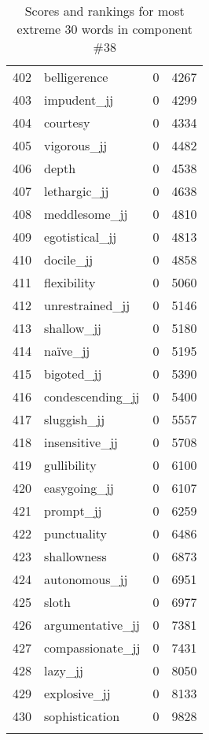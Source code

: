\begin{longtable}[!htbp]{| rlr@{.}l |}
    402 & belligerence & 0 & 4267 \\
    403 & impudent\_jj & 0 & 4299 \\
    404 & courtesy & 0 & 4334 \\
    405 & vigorous\_jj & 0 & 4482 \\
    406 & depth & 0 & 4538 \\
    407 & lethargic\_jj & 0 & 4638 \\
    408 & meddlesome\_jj & 0 & 4810 \\
    409 & egotistical\_jj & 0 & 4813 \\
    410 & docile\_jj & 0 & 4858 \\
    411 & flexibility & 0 & 5060 \\
    412 & unrestrained\_jj & 0 & 5146 \\
    413 & shallow\_jj & 0 & 5180 \\
    414 & naïve\_jj & 0 & 5195 \\
    415 & bigoted\_jj & 0 & 5390 \\
    416 & condescending\_jj & 0 & 5400 \\
    417 & sluggish\_jj & 0 & 5557 \\
    418 & insensitive\_jj & 0 & 5708 \\
    419 & gullibility & 0 & 6100 \\
    420 & easygoing\_jj & 0 & 6107 \\
    421 & prompt\_jj & 0 & 6259 \\
    422 & punctuality & 0 & 6486 \\
    423 & shallowness & 0 & 6873 \\
    424 & autonomous\_jj & 0 & 6951 \\
    425 & sloth & 0 & 6977 \\
    426 & argumentative\_jj & 0 & 7381 \\
    427 & compassionate\_jj & 0 & 7431 \\
    428 & lazy\_jj & 0 & 8050 \\
    429 & explosive\_jj & 0 & 8133 \\
    430 & sophistication & 0 & 9828 \\
    \hline
    \caption{Scores and rankings for most extreme 30 words in component \#38} \\
\end{longtable}
